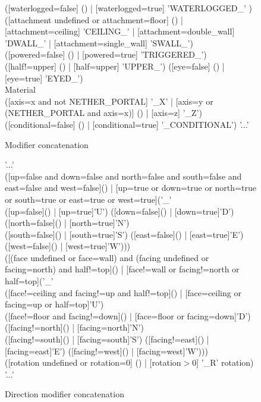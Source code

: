 \begin{subfigures}
	\begin{figure}
		\begin{rail}
			([waterlogged=false] () | [waterlogged=true] 'WATERLOGGED\_' ) ([attachment undefined or attachment=floor] () | [attachment=ceiling] 'CEILING\_' | [attachment=double\_wall] 'DWALL\_' | [attachment=single\_wall] 'SWALL\_') \\
			([powered=false] () | [powered=true] 'TRIGGERED\_') ([half!=upper] () | [half=upper] 'UPPER\_') ([eye=false] () | [eye=true] 'EYED\_') \\
			Material \\
			([axis=x and not NETHER\_PORTAL] '\_X' | [axis=y or (NETHER\_PORTAL and axis=x)] () | [axis=z] '\_Z') \\
			([conditional=false] () | [conditional=true] '\_CONDITIONAL')
			'...'
		\end{rail}
		\label{rail:modifier-concatenation}
		\caption{Modifier concatenation}
	\end{figure}

	\begin{figure}
		\begin{rail}
			'...' \\
			([up=false and down=false and north=false and south=false and east=false and west=false]() | [up=true or down=true or north=true or south=true or east=true or west=true]('\_' \\ ([up=false]() | [up=true]'U') ([down=false]() | [down=true]'D') ([north=false]() | [north=true]'N') \\ ([south=false]() | [south=true]'S') ([east=false]() | [east=true]'E') ([west=false]() | [west=true]'W'))) \\
			([(face undefined or face=wall) and (facing undefined or facing=north) and half!=top]() | [face!=wall or facing!=north or half=top]('\_' \\
			([face!=ceiling and facing!=up and half!=top]() | [face=ceiling or facing=up or half=top]'U') \\ ([face!=floor and facing!=down]() | [face=floor or facing=down]'D') ([facing!=north]() | [facing=north]'N') \\ ([facing!=south]() | [facing=south]'S') ([facing!=east]() | [facing=east]'E') ([facing!=west]() | [facing=west]'W'))) \\
			([rotation undefined or rotation=0] () | [rotation$>$0] '\_R' rotation) '...'
		\end{rail}
		\label{rail:modifier-concatenation}
		\caption{Direction modifier concatenation}
	\end{figure}
	

\end{subfigures}
